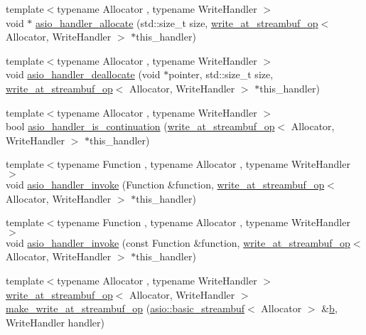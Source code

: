 \begin{DoxyCompactItemize}
\item 
{\footnotesize template$<$typename Allocator , typename Write\+Handler $>$ }\\void $\ast$ \hyperlink{namespaceasio_1_1detail_aef89c386ee5f7685676e478b7ea1dc6e}{asio\+\_\+handler\+\_\+allocate} (std\+::size\+\_\+t size, \hyperlink{classasio_1_1detail_1_1write__at__streambuf__op}{write\+\_\+at\+\_\+streambuf\+\_\+op}$<$ Allocator, Write\+Handler $>$ $\ast$this\+\_\+handler)
\item 
{\footnotesize template$<$typename Allocator , typename Write\+Handler $>$ }\\void \hyperlink{namespaceasio_1_1detail_af12434662b32e386fdec0c188249a649}{asio\+\_\+handler\+\_\+deallocate} (void $\ast$pointer, std\+::size\+\_\+t size, \hyperlink{classasio_1_1detail_1_1write__at__streambuf__op}{write\+\_\+at\+\_\+streambuf\+\_\+op}$<$ Allocator, Write\+Handler $>$ $\ast$this\+\_\+handler)
\item 
{\footnotesize template$<$typename Allocator , typename Write\+Handler $>$ }\\bool \hyperlink{namespaceasio_1_1detail_af1b5d2ccef55e8281824dc5b4ffeab72}{asio\+\_\+handler\+\_\+is\+\_\+continuation} (\hyperlink{classasio_1_1detail_1_1write__at__streambuf__op}{write\+\_\+at\+\_\+streambuf\+\_\+op}$<$ Allocator, Write\+Handler $>$ $\ast$this\+\_\+handler)
\item 
{\footnotesize template$<$typename Function , typename Allocator , typename Write\+Handler $>$ }\\void \hyperlink{namespaceasio_1_1detail_af422012b4f59fcac7c621c8cfff65d2f}{asio\+\_\+handler\+\_\+invoke} (Function \&function, \hyperlink{classasio_1_1detail_1_1write__at__streambuf__op}{write\+\_\+at\+\_\+streambuf\+\_\+op}$<$ Allocator, Write\+Handler $>$ $\ast$this\+\_\+handler)
\item 
{\footnotesize template$<$typename Function , typename Allocator , typename Write\+Handler $>$ }\\void \hyperlink{namespaceasio_1_1detail_ac6e55b5a1a22cec838222623adbe70b5}{asio\+\_\+handler\+\_\+invoke} (const Function \&function, \hyperlink{classasio_1_1detail_1_1write__at__streambuf__op}{write\+\_\+at\+\_\+streambuf\+\_\+op}$<$ Allocator, Write\+Handler $>$ $\ast$this\+\_\+handler)
\item 
{\footnotesize template$<$typename Allocator , typename Write\+Handler $>$ }\\\hyperlink{classasio_1_1detail_1_1write__at__streambuf__op}{write\+\_\+at\+\_\+streambuf\+\_\+op}$<$ Allocator, Write\+Handler $>$ \hyperlink{namespaceasio_1_1detail_a18b35c1789218775d2ebd8a0ec642f5a}{make\+\_\+write\+\_\+at\+\_\+streambuf\+\_\+op} (\hyperlink{classasio_1_1basic__streambuf}{asio\+::basic\+\_\+streambuf}$<$ Allocator $>$ \&\hyperlink{group__async__read_ga945a5c18fa77a9e2eba420f8f44b2a4f}{b}, Write\+Handler handler)

\end{DoxyCompactItemize}
